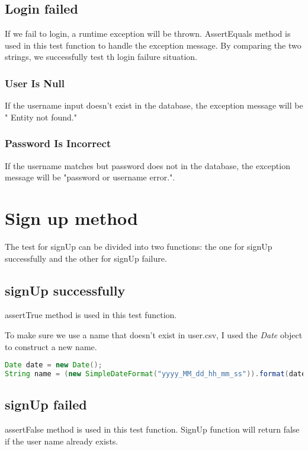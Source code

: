 \documentclass[a4paper]{report}
\begin{document}
\subsection{Login failed}
\par If we fail to login, a runtime exception will be thrown. AssertEquals method is used in this test function to handle the exception message. By comparing the two strings, we successfully test th login failure situation.
\subsubsection{User Is Null}
 \par If the username input doesn't exist in the database, the exception message will be " Entity not found." 
\subsubsection{Password Is Incorrect}
\par If the username matches but password does not in the database, the exception message will be "password or username error.". 
\section{Sign up method}
\par The test for signUp can be divided into two functions: the one for signUp successfully and the other for signUp failure.
\subsection{signUp successfully}
\par assertTrue method is used in this test function.
\par To make sure we use a name that doesn't exist in user.csv, I used the \emph{Date} object to construct a new name.
\begin{lstlisting}[language=java]
Date date = new Date();
String name = (new SimpleDateFormat("yyyy_MM_dd_hh_mm_ss")).format(date);
\end{lstlisting}

\subsection{signUp failed}
\par assertFalse method is used in this test function. SignUp function will return false if the user name already exists.
\end{document}
